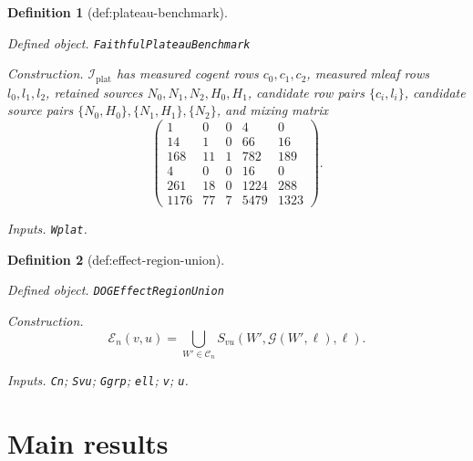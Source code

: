 \documentclass{article}
\newtheorem{definition}{Definition}
\begin{document}
\begin{definition}[def:plateau-benchmark]\label{def:plateau-benchmark}
\par\smallskip\noindent\emph{Defined object.} \texttt{FaithfulPlateauBenchmark}
\par\smallskip\noindent\emph{Construction.} \(\mathcal I_{\mathrm{plat}}\) has measured cogent rows \(c_0,c_1,c_2\), measured mleaf rows \(l_0,l_1,l_2\), retained sources \(N_0,N_1,N_2,H_0,H_1\), candidate row pairs \(\{c_i,l_i\}\), candidate source pairs \(\{N_0,H_0\},\{N_1,H_1\},\{N_2\}\), and mixing matrix \[\begin{pmatrix}1&0&0&4&0\\14&1&0&66&16\\168&11&1&782&189\\4&0&0&16&0\\261&18&0&1224&288\\1176&77&7&5479&1323\end{pmatrix}.\]
\par\smallskip\noindent\emph{Inputs.} \texttt{Wplat}.
\end{definition}

\begin{definition}[def:effect-region-union]\label{def:effect-region-union}
\par\smallskip\noindent\emph{Defined object.} \texttt{DOGEffectRegionUnion}
\par\smallskip\noindent\emph{Construction.} \[\mathcal E_n(v,u)=\bigcup_{W'\in\mathcal C_n}S_{vu}(W',\mathcal G(W',\ell),\ell).\]
\par\smallskip\noindent\emph{Inputs.} \texttt{Cn}; \texttt{Svu}; \texttt{Ggrp}; \texttt{ell}; \texttt{v}; \texttt{u}.
\end{definition}

\section{Main results}
\end{document}
